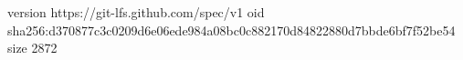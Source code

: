 version https://git-lfs.github.com/spec/v1
oid sha256:d370877c3c0209d6e06ede984a08bc0c882170d84822880d7bbde6bf7f52be54
size 2872
